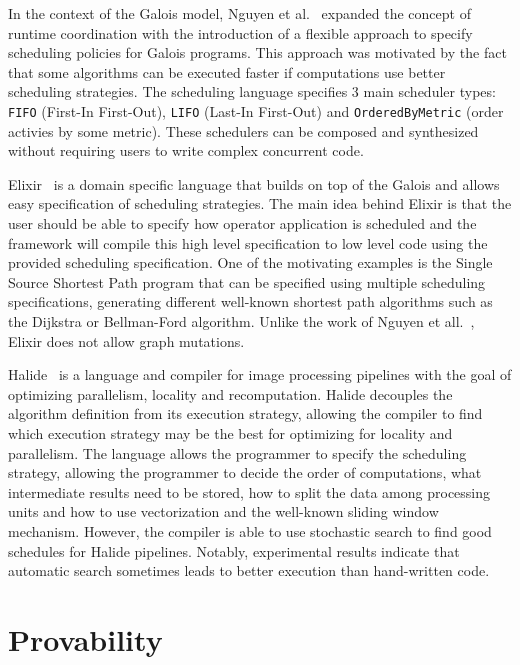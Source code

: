 In the context of the Galois model, Nguyen et al.~\cite{nguyen11} expanded the
concept of runtime coordination with the introduction of a flexible approach to specify
scheduling policies for Galois programs. This approach was motivated by the fact
that some algorithms can be executed faster if computations use better
scheduling strategies. The scheduling language specifies 3 main scheduler types:
\texttt{FIFO} (First-In First-Out), \texttt{LIFO} (Last-In First-Out) and
\texttt{OrderedByMetric} (order activies by some metric). These schedulers can
be composed and synthesized without requiring users to write complex concurrent
code.

Elixir~\cite{Prountzos:2012:ESS:2384616.2384644} is a
domain specific language that builds on top of the Galois
and allows easy specification of scheduling strategies.
The main idea behind Elixir is that the user
should be able to specify how operator application is scheduled and the framework will
compile this high level specification to low level code using the provided
scheduling specification. One of the motivating examples is the Single Source
Shortest Path program that can be specified using multiple scheduling
specifications, generating different well-known shortest path algorithms such as
the Dijkstra or Bellman-Ford algorithm. Unlike the work of Nguyen et
all.~\cite{nguyen11}, Elixir does not allow graph mutations.

Halide~\cite{Ragan-Kelley:2013:HLC:2491956.2462176} is a language and compiler
for image processing pipelines with the goal of optimizing parallelism, locality
and recomputation. Halide decouples the algorithm definition from its execution
strategy, allowing the compiler to find which execution strategy may be the best
for optimizing for locality and parallelism. The language allows the programmer
to specify the scheduling strategy, allowing the programmer to decide the order
of computations, what intermediate results need to be stored, how to split the
data among processing units and how to use vectorization and the well-known
sliding window mechanism. However, the compiler is able to use stochastic search
to find good schedules for Halide pipelines. Notably, experimental results
indicate that automatic search sometimes leads to better execution than
hand-written code.

\section{Provability}


